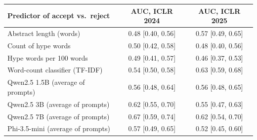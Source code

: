 \begin{tabular}{lcc}
\toprule
\textbf{Predictor of accept vs.\ reject} & \textbf{AUC, ICLR 2024} & \textbf{AUC, ICLR 2025} \\
\midrule
Abstract length (words) & 0.48 {\scriptsize[0.40, 0.56]} & 0.57 {\scriptsize[0.49, 0.65]} \\
Count of hype words & 0.50 {\scriptsize[0.42, 0.58]} & 0.48 {\scriptsize[0.40, 0.56]} \\
Hype words per 100 words & 0.49 {\scriptsize[0.41, 0.57]} & 0.46 {\scriptsize[0.37, 0.53]} \\
Word-count classifier (TF-IDF) & 0.54 {\scriptsize[0.50, 0.58]} & 0.63 {\scriptsize[0.59, 0.68]} \\
\midrule
Qwen2.5 1.5B (average of prompts) & 0.56 {\scriptsize[0.48, 0.64]} & 0.56 {\scriptsize[0.48, 0.65]} \\
Qwen2.5 3B (average of prompts) & 0.62 {\scriptsize[0.55, 0.70]} & 0.55 {\scriptsize[0.47, 0.63]} \\
Qwen2.5 7B (average of prompts) & 0.67 {\scriptsize[0.59, 0.74]} & 0.62 {\scriptsize[0.54, 0.70]} \\
Phi-3.5-mini (average of prompts) & 0.57 {\scriptsize[0.49, 0.65]} & 0.52 {\scriptsize[0.45, 0.60]} \\
\bottomrule
\end{tabular}
